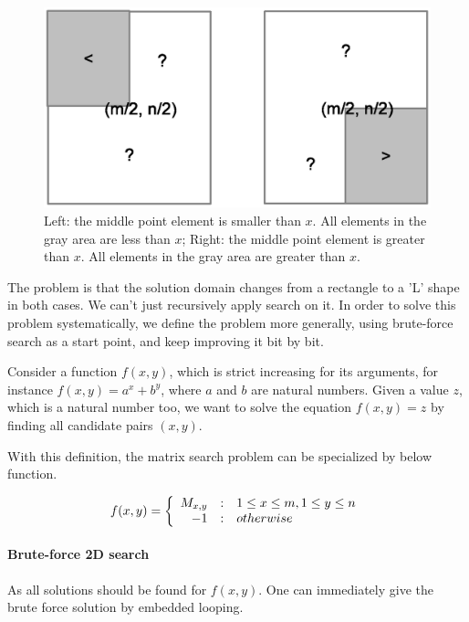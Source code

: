 \documentclass[UTF8]{article}
\begin{document}
\begin{figure}[htbp]
 \centering
 \includegraphics[scale=0.5]{img/bsearch-2D.eps}
 \caption{Left: the middle point element is smaller than $x$. All elements in the gray area are less than $x$; Right: the middle point element is greater than $x$. All elements in the gray area are greater than $x$.}
 \label{fig:bsearch-2D}
\end{figure}

The problem is that the solution domain changes from a rectangle to a 'L' shape in both cases. We can't just
recursively apply search on it. In order to solve this problem systematically, we define the problem more
generally, using brute-force search as a start point, and keep improving it bit by bit.

Consider a function $f(x, y)$, which is strict increasing for its arguments, for instance $f(x, y) = a^x + b^y$, where
$a$ and $b$ are natural numbers. Given a value $z$, which is a natural number too, we want to solve the equation
$f(x, y) = z$ by finding all candidate pairs $(x, y)$.

With this definition, the matrix search problem can be specialized by below function.

\[
f(x, y) = \left \{
  \begin{array}
  {r@{\quad:\quad}l}
  M_{x, y} & 1 \leq x \leq m, 1 \leq y \leq n \\
  -1 & otherwise
  \end{array}
\right.
\]

\paragraph{Brute-force 2D search}

As all solutions should be found for $f(x, y)$. One can immediately give the
brute force solution by embedded looping.
\end{document}
